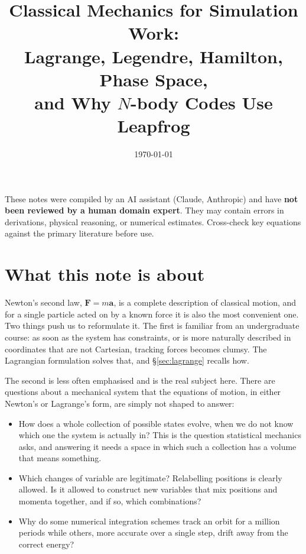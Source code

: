 \documentclass[12pt]{article}
\title{Classical Mechanics for Simulation Work:\\
       Lagrange, Legendre, Hamilton, Phase Space,\\
       and Why $N$-body Codes Use Leapfrog}
\author{}
\date{\today}
\renewcommand{\vec}[1]{\bm{#1}}
\begin{document}
\maketitle
\tableofcontents
\newpage

\begin{tcolorbox}[colback=yellow!10!white, colframe=orange!75!black,
                  title={\bfseries Disclaimer}]
These notes were compiled by an AI assistant (Claude, Anthropic) and have
\textbf{not been reviewed by a human domain expert}.  They may contain
errors in derivations, physical reasoning, or numerical estimates.
Cross-check key equations against the primary literature before use.
\end{tcolorbox}
\vspace{0.5em}

\section{What this note is about}
\label{sec:intro}

Newton's second law, $\vec F = m\vec a$, is a complete description of
classical motion, and for a single particle acted on by a known force
it is also the most convenient one.  Two things push us to reformulate
it.  The first is familiar from an undergraduate course: as soon as the
system has constraints, or is more naturally described in coordinates
that are not Cartesian, tracking forces becomes clumsy.  The Lagrangian
formulation solves that, and \S\ref{sec:lagrange} recalls how.

The second is less often emphasised and is the real subject here.
There are questions about a mechanical system that the equations of
motion, in either Newton's or Lagrange's form, are simply not shaped to
answer:

\begin{itemize}
  \item How does a whole collection of possible states evolve, when we
        do not know which one the system is actually in?  This is the
        question statistical mechanics asks, and answering it needs a
        space in which such a collection has a volume that means
        something.
  \item Which changes of variable are legitimate?  Relabelling
        positions is clearly allowed.  Is it allowed to construct new
        variables that mix positions and momenta together, and if so,
        which combinations?
  \item Why do some numerical integration schemes track an orbit for a
        million periods while others, more accurate over a single step,
        drift away from the correct energy?
\end{itemize}
\end{document}
